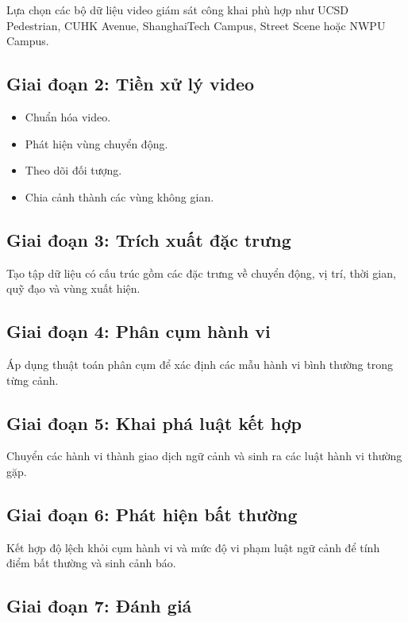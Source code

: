 Lựa chọn các bộ dữ liệu video giám sát công khai phù hợp như UCSD Pedestrian, CUHK Avenue, ShanghaiTech Campus, Street Scene hoặc NWPU Campus.

\subsection{Giai đoạn 2: Tiền xử lý video}

\begin{itemize}
    \item Chuẩn hóa video.
    \item Phát hiện vùng chuyển động.
    \item Theo dõi đối tượng.
    \item Chia cảnh thành các vùng không gian.
\end{itemize}

\subsection{Giai đoạn 3: Trích xuất đặc trưng}

Tạo tập dữ liệu có cấu trúc gồm các đặc trưng về chuyển động, vị trí, thời gian, quỹ đạo và vùng xuất hiện.

\subsection{Giai đoạn 4: Phân cụm hành vi}

Áp dụng thuật toán phân cụm để xác định các mẫu hành vi bình thường trong từng cảnh.

\subsection{Giai đoạn 5: Khai phá luật kết hợp}

Chuyển các hành vi thành giao dịch ngữ cảnh và sinh ra các luật hành vi thường gặp.

\subsection{Giai đoạn 6: Phát hiện bất thường}

Kết hợp độ lệch khỏi cụm hành vi và mức độ vi phạm luật ngữ cảnh để tính điểm bất thường và sinh cảnh báo.

\subsection{Giai đoạn 7: Đánh giá}

